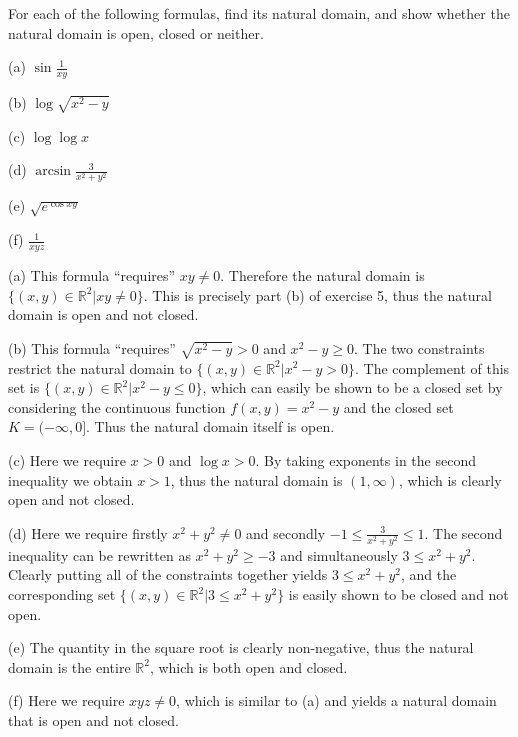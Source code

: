 \begin{exercise}{7}
    For each of the following formulas, find its natural domain, and show whether the natural domain is open, closed or neither.

    (a) $\sin{\frac{1}{xy}}$

    (b) $\log \sqrt{x^2-y}$

    (c) $\log \log x$

    (d) $\arcsin \frac{3}{x^2+y^2}$

    (e) $\sqrt{e^{\cos xy}}$

    (f) $\frac{1}{xyz}$
\end{exercise}

\begin{solution}

    (a) This formula ``requires'' $xy \neq 0$. Therefore the natural domain is $\{(x, y) \in \mathbb{R}^2 \lvert xy \neq 0\}$. This is precisely part (b) of exercise 5, thus the natural domain is open and not closed.

    (b) This formula ``requires'' $\sqrt{x^2-y} > 0$ and $x^2-y \geq 0$. The two constraints restrict the natural domain to $\{(x, y) \in \mathbb{R}^2 \lvert x^2 -y > 0\}$. The complement of this set is $\{(x, y) \in \mathbb{R}^2 \lvert x^2 - y \leq 0\}$, which can easily be shown to be a closed set by considering the continuous function $f(x, y) = x^2 - y$ and the closed set $K = (-\infty, 0]$. Thus the natural domain itself is open.

    (c) Here we require $x > 0$ and $\log x > 0$. By taking exponents in the second inequality we obtain $x > 1$, thus the natural domain is $(1, \infty)$, which is clearly open and not closed.

    (d) Here we require firstly $x^2+y^2 \neq 0$ and secondly $-1 \leq \frac{3}{x^2+y^2} \leq 1$. The second inequality can be rewritten as $x^2+y^2 \geq - 3$ and simultaneously $3 \leq x^2 + y^2$. Clearly putting all of the constraints together yields $3 \leq x^2+y^2$, and the corresponding set $\{(x, y) \in \mathbb{R}^2 \lvert 3 \leq x^2 + y^2\}$ is easily shown to be closed and not open.

    (e) The quantity in the square root is clearly non-negative, thus the natural domain is the entire $\mathbb{R}^2$, which is both open and closed.

    (f) Here we require $xyz \neq 0$, which is similar to (a) and yields a natural domain that is open and not closed.
\end{solution}

